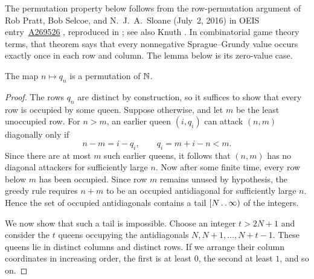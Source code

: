 The permutation property below follows from the row-permutation
argument of Rob Pratt, Bob Selcoe, and N.~J.~A.~Sloane (July~2, 2016)
in OEIS entry~\href{https://oeis.org/A269526}{A269526} \cite[Theorem~R]{OEIS}, reproduced in
\cite[Theorem~23]{DSS}; see also Knuth
\cite[exercise~7.2.2.1--37]{Knuth4B}. 
In combinatorial game theory terms, that theorem says that every
nonnegative Sprague--Grundy value occurs exactly once in each row and
column. The lemma below is its zero-value case. 
\begin{lemma}\label{lem:surjective}
The map $n\mapsto q_n$ is a permutation of $\mathbb N$.
\end{lemma}
\begin{proof}
The rows $q_n$ are distinct by construction, so it suffices to show that
every row is occupied by some queen. Suppose otherwise, and let $m$ be the least unoccupied row. 
For $n>m$, an earlier queen $(i,q_i)$ can attack $(n,m)$ diagonally
only if
\[
 n-m=i-q_i,\qquad q_i=m+i-n<m.
\]
Since there are at most $m$ such earlier queens, it follows that $(n,m)$ has no diagonal attackers for sufficiently large $n$. 
Now after some finite time, every row below $m$ has been occupied.
Since row $m$ remains unused by hypothesis,
the greedy rule requires $n+m$ to be an occupied antidiagonal for sufficiently large $n$. Hence the
set of occupied antidiagonals contains a tail $[N\mathinner{\ldotp\ldotp}\infty)$ of the integers.

We now show that such a tail is impossible. Choose an integer $t>2N+1$
and consider the $t$ queens occupying the antidiagonals
$N,N+1,\ldots,N+t-1$. These queens lie in distinct columns and distinct
rows. If we arrange their column coordinates in increasing order, the
first is at least $0$, the second at least $1$, and so on.


\end{proof}
